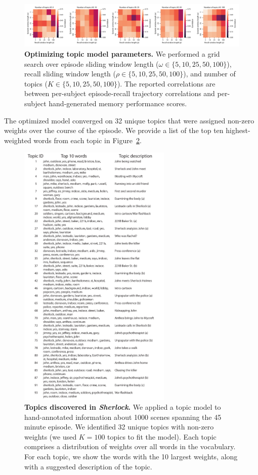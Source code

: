 \documentclass{article}
\begin{document}
\begin{figure}[]
\centering
\includegraphics[width=1\textwidth]{figs/parameter_search}
\caption{\small \textbf{Optimizing topic model parameters.}  We performed a grid search over episode sliding window length ($\omega \in \{5, 10, 25, 50, 100 \}$), recall sliding window length ($\rho \in \{5, 10, 25, 50, 100 \}$), and number of topics ($K \in \{5, 10, 25, 50, 100 \}$).  The reported correlations are between per-subject episode-recall trajectory correlations and per-subject hand-generated memory performance scores.}
\label{fig:paramsearch}
\end{figure}

The optimized model converged on 32 unique topics that were assigned non-zero weights over the course of the episode.  We provide a list of the top ten highest-weighted words from each topic in Figure~\ref{fig:topics}.

\begin{figure}[]
\centering
\includegraphics[width=0.65\textwidth]{figs/topic_words}
\caption{\small \textbf{Topics discovered in \textit{Sherlock}.} We applied a topic model to hand-annotated information about 1000 scenes spanning the 45 minute episode.  We identified 32 unique topics with non-zero weights (we used $K=100$ topics to fit the model).  Each topic comprises a distribution of weights over all words in the vocabulary.  For each topic, we show the words with the 10 largest weights, along with a suggested description of the topic.}
\label{fig:topics}
\end{figure}
\end{document}
